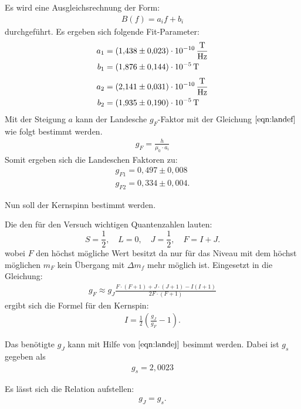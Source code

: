 Es wird eine Ausgleichsrechnung der Form:
\begin{align*}
  B(f)=a_if+b_i
\end{align*}
durchgeführt.
Es ergeben sich folgende Fit-Parameter:
\begin{align*}
  a_1&=\SI{1.438\pm 0.023e-10}{\frac{T}{Hz}}\\
  b_1&=\SI{1.876\pm 0.144e-5}{T}
\end{align*}
\begin{align*}
  a_2&=\SI{2.141\pm0.031e-10}{\frac{T}{Hz}}\\
  b_2&=\SI{1.935\pm0.190e-5}{T}
\end{align*}
\FloatBarrier
Mit der Steigung $a$ kann der Landesche $g_F$-Faktor mit der Gleichung $\ref{eqn:landef}$wie folgt bestimmt werden.
\begin{align*}
  g_F = \frac{h}{\mu_0\cdot a_i}
\end{align*}
Somit ergeben sich die Landeschen Faktoren zu:
\begin{align*}
  g_{F1} = 0,497\pm0,008\\
  g_{F2} = 0,334\pm0,004.
\end{align*}

Nun soll der Kernspinn bestimmt werden.

Die den für den Versuch wichtigen Quantenzahlen lauten:
\begin{equation}
	S = \frac{1}{2},\quad L = 0,\quad J = \frac{1}{2},\quad F = I + J.
\end{equation}
wobei $F$ den höchst mögliche Wert besitzt da nur für das Niveau mit dem höchst möglichen $m_F$
kein Übergang mit $\Delta m_{f}$ mehr möglich ist. Eingesetzt in die Gleichung:
\begin{align}
	g_F\approx g_J\frac{F\cdot(F+1)+J\cdot(J+1)-I(I+1)}{2F\cdot(F+1)}
	\label{eq:lande_faktor_gf}
\end{align}
ergibt sich die Formel für den Kernspin:
\begin{align*}
  I = \frac{1}{2}\left(\frac{g_J}{g_F}-1\right).
\end{align*}

Das benötigte $g_J$ kann mit Hilfe von $\ref{eqn:landej}$ besimmt werden.
Dabei ist $g_s$ gegeben als
\begin{align*}
  g_s = 2,0023
\end{align*}

Es lässt sich die Relation aufstellen:
\begin{align*}
  g_J=g_s.
\end{align*}

